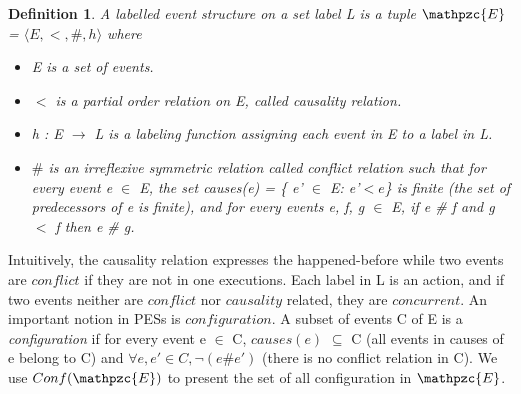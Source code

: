 \documentclass[a4paper,11pt]{article}
\newtheorem{definition}{Definition}
\begin{document}
\begin{definition} A labelled event structure on a set label L is a tuple  $\mathpzc{E}$ = $\langle E,<,\#,h \rangle$ where
 \begin{itemize}[noitemsep]
 	\setlength{\itemsep}{2pt}
\item E is a set of events.
\item $<$ is a partial order relation on E, called causality relation.
\item h : E $\rightarrow$ L is a labeling function assigning each event in E to a label in L. 
\item  $\#$ is an irreflexive symmetric relation called conflict relation such that for every event e $\in$ E, the set causes(e) = \{ e' $\in$ E: e'$<e$\} is finite (the set of predecessors of e is finite), and for every events e, f, g $\in$ E, if e \# f and g $<$ f then e \# g.
\end{itemize}
\end{definition}
 Intuitively, the causality relation expresses the happened-before while two events are $conflict$ if they are not in one executions. Each label in L is an action, and if two events neither are $conflict$ nor $causality$ related, they are $concurrent$. An important notion in PESs is $configuration$. A subset of events C of E is a \textit{configuration} if for every event e $\in$ C, $causes(e)$ $\subseteq$ C (all events in causes of e belong to C) and $\forall e, e' \in C, \neg(e \# e')$ (there is no conflict relation in C). We use $Conf(\mathpzc{E})$ to present the set of all configuration in $\mathpzc{E}$.
 
\end{document}
